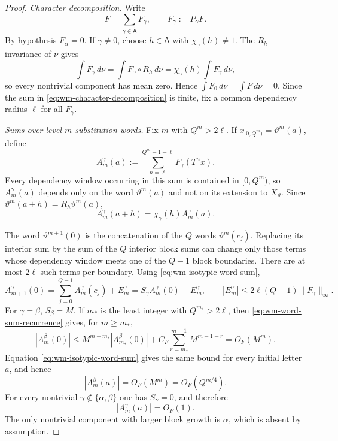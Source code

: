 \documentclass[11pt,reqno,a4paper]{amsart}
\numberwithin{equation}{section}
\theoremstyle{compact}
\theoremstyle{definition}
\theoremstyle{definition}
\begin{document}
\begin{proof}
\smallskip\noindent\emph{Character decomposition.}
Write
\begin{equation}\label{eq:wm-character-decomposition}
  F=\sum_{\gamma\in\widehat{\mathsf A}}F_\gamma,
  \qquad
  F_\gamma:=P_\gamma F.
\end{equation}
By hypothesis $F_\alpha=0$.  If $\gamma\neq0$, choose $h\in\mathsf A$ with
$\chi_\gamma(h)\neq1$.  The $R_h$-invariance of $\nu$ gives
\[
  \int F_\gamma\,d\nu
  =\int F_\gamma\circ R_h\,d\nu
  =\chi_\gamma(h)\int F_\gamma\,d\nu,
\]
so every nontrivial component has mean zero.  Hence
$\int F_0\,d\nu=\int F\,d\nu=0$.  Since the sum in
\eqref{eq:wm-character-decomposition} is finite, fix a common dependency
radius $\ell$ for all $F_\gamma$.

\smallskip\noindent\emph{Sums over level-$m$ substitution words.}
Fix $m$ with $Q^m>2\ell$.  If
$x_{[0,Q^m)}=\vartheta^m(a)$, define
\begin{equation}\label{eq:wm-interior-sum-definition}
  A_m^\gamma(a)
  :=\sum_{n=\ell}^{Q^m-1-\ell}F_\gamma(T^nx).
\end{equation}
Every dependency window occurring in this sum is contained in
$[0,Q^m)$, so $A_m^\gamma(a)$ depends only on the word
$\vartheta^m(a)$ and not on its extension to $X_\vartheta$.  Since
$\vartheta^m(a+h)=R_h\vartheta^m(a)$,
\begin{equation}\label{eq:wm-isotypic-word-sum}
  A_m^\gamma(a+h)=\chi_\gamma(h)A_m^\gamma(a).
\end{equation}

The word $\vartheta^{m+1}(0)$ is the concatenation of the $Q$ words
$\vartheta^m(c_j)$.  Replacing its interior sum by the sum of the $Q$
interior block sums can change only those terms whose dependency window
meets one of the $Q-1$ block boundaries.  There are at most $2\ell$ such
terms per boundary.  Using \eqref{eq:wm-isotypic-word-sum},
\begin{equation}\label{eq:wm-word-sum-recurrence}
  A_{m+1}^\gamma(0)
  =\sum_{j=0}^{Q-1}A_m^\gamma(c_j)+E_m^\gamma
  =S_\gamma A_m^\gamma(0)+E_m^\gamma,
  \qquad
  |E_m^\gamma|\leq2\ell(Q-1)\|F_\gamma\|_\infty.
\end{equation}
For $\gamma=\beta$, $S_\beta=M$.  If $m_*$ is the least integer with
$Q^{m_*}>2\ell$, then \eqref{eq:wm-word-sum-recurrence} gives, for
$m\geq m_*$,
\[
  |A_m^\beta(0)|
  \leq M^{m-m_*}|A_{m_*}^\beta(0)|
     +C_F\sum_{r=m_*}^{m-1}M^{m-1-r}
  =O_F(M^m).
\]
Equation \eqref{eq:wm-isotypic-word-sum} gives the same bound for every
initial letter $a$, and hence
\begin{equation}\label{eq:wm-beta-complete-word-bound}
  |A_m^\beta(a)|=O_F(M^m)=O_F(Q^{m/4}).
\end{equation}
For every nontrivial $\gamma\notin\{\alpha,\beta\}$ one has
$S_\gamma=0$, and therefore
\begin{equation}\label{eq:wm-other-character-complete-word-bound}
  |A_m^\gamma(a)|=O_F(1).
\end{equation}
The only nontrivial component with larger block growth is $\alpha$, which
is absent by assumption.


\end{proof}
\end{document}
